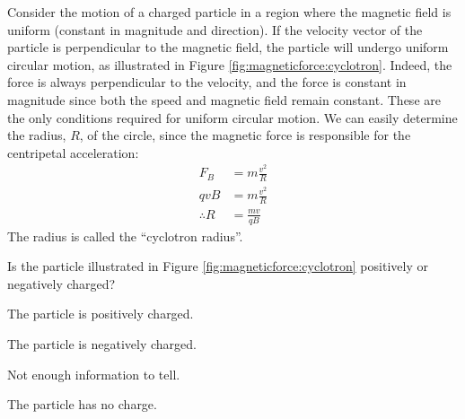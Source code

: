 Consider the motion of a charged particle in a region where the magnetic field is uniform (constant in magnitude and direction). If the velocity vector of the particle is perpendicular to the magnetic field, the particle will undergo uniform circular motion, as illustrated in Figure \ref{fig:magneticforce:cyclotron}. 
Indeed, the force is always perpendicular to the velocity, and the force is constant in magnitude since both the speed and magnetic field remain constant. These are the only conditions required for uniform circular motion. We can easily determine the radius, $R$, of the circle, since the magnetic force is responsible for the centripetal acceleration:
\begin{align*}
F_B &= m\frac{v^2}{R}\\
qvB &= m\frac{v^2}{R}\\
\therefore R &= \frac{mv}{qB}
\end{align*}
The radius is called the ``cyclotron radius''. 

\begin{checkpoint}{}
	\begin{MCquestion}{Is the particle illustrated in Figure \ref{fig:magneticforce:cyclotron} positively or negatively charged?}
		\item The particle is positively charged. \correct
		\item The particle is negatively charged.
		\item Not enough information to tell.
		\item The particle has no charge.
	\end{MCquestion}
\end{checkpoint}

